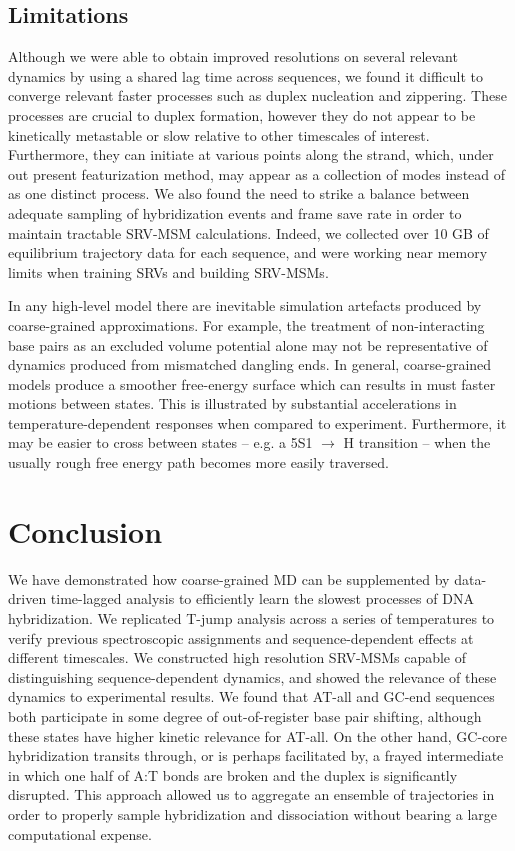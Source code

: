 \documentclass[journal=jpcbfk,manuscript=article]{achemso}
\begin{document}
\subsection{Limitations}

Although we were able to obtain improved resolutions on several relevant dynamics by using a shared lag time across sequences, we found it difficult to converge relevant faster processes such as duplex nucleation and zippering. These processes are crucial to duplex formation, however they do not appear to be kinetically metastable or slow relative to other timescales of interest. Furthermore, they can initiate at various points along the strand, which, under out present featurization method, may appear as a collection of modes instead of as one distinct process. We also found the need to strike a balance between adequate sampling of hybridization events and frame save rate in order to maintain tractable SRV-MSM calculations. Indeed, we collected over 10 GB of equilibrium trajectory data for each sequence, and were working near memory limits when training SRVs and building SRV-MSMs.

In any high-level model there are inevitable simulation artefacts produced by coarse-grained approximations. For example, the treatment of non-interacting base pairs as an excluded volume potential alone may not be representative of dynamics produced from mismatched dangling ends. In general, coarse-grained models produce a smoother free-energy surface which can results in must faster motions between states. This is illustrated by substantial accelerations in temperature-dependent responses when compared to experiment. Furthermore, it may be easier to cross between states -- e.g. a 5S1 $\rightarrow$ H transition -- when the usually rough free energy path becomes more easily traversed. 

\section{\label{sec:conc}Conclusion}

We have demonstrated how coarse-grained MD can be supplemented by data-driven time-lagged analysis to efficiently learn the slowest processes of DNA hybridization. We replicated T-jump analysis across a series of temperatures to verify previous spectroscopic assignments and sequence-dependent effects at different timescales. We constructed high resolution SRV-MSMs capable of distinguishing sequence-dependent dynamics, and showed the relevance of these dynamics to experimental results. We found that AT-all and GC-end sequences both participate in some degree of out-of-register base pair shifting, although these states have higher kinetic relevance for AT-all. On the other hand, GC-core hybridization transits through, or is perhaps facilitated by, a frayed intermediate in which one half of A:T bonds are broken and the duplex is significantly disrupted. This approach allowed us to aggregate an ensemble of trajectories in order to properly sample hybridization and dissociation without bearing a large computational expense.
\end{document}
